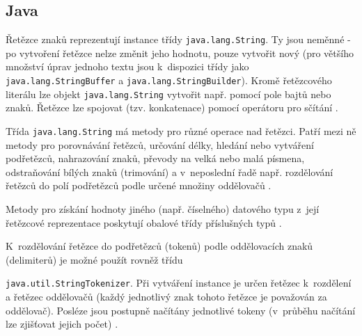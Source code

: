 \documentclass{bakalarka}
\begin{document}
\subsection{Java}
Řetězce znaků reprezentují instance třídy \texttt{java.lang.String}. Ty jsou neměnné - po vytvoření řetězce nelze změnit jeho hodnotu, pouze vytvořit nový (pro většího množství úprav jednoho textu jsou k~dispozici třídy jako \texttt{java.lang.StringBuffer} a \texttt{java.lang.StringBuilder}). Kromě řetězcového literálu lze objekt \texttt{java.lang.String} vytvořit např. pomocí pole bajtů nebo znaků. Řetězce lze spojovat (tzv. konkatenace) pomocí operátoru pro sčítání \cite{java-guide-strings, java-guide-string, java-guide-stringbuffer, java-guide-stringbuilder}.\par
Třída \texttt{java.lang.String} má metody pro různé operace nad řetězci. Patří mezi ně metody pro porovnávání řetězců, určování délky, hledání nebo vytváření podřetězců, nahrazování znaků, převody na velká nebo malá písmena, odstraňování bílých znaků (trimování) a v~neposlední řadě např. rozdělování řetězců do polí podřetězců podle určené množiny oddělovačů \cite{java-guide-string}.\par
Metody pro získání hodnoty jiného (např. číselného) datového typu z~její řetězcové reprezentace poskytují obalové třídy příslušných typů \cite{java-guide-string, java-guide-byte, java-guide-short, java-guide-integer, java-guide-long, java-guide-float, java-guide-double, java-guide-boolean, java-guide-character}.\par
K~rozdělování řetězce do podřetězců (tokenů) podle oddělovacích znaků (delimiterů) je možné použít rovněž třídu \par\noindent\texttt{java.util.StringTokenizer}. Při vytváření instance je určen řetězec k~rozdělení a řetězec oddělovačů (každý jednotlivý znak tohoto řetězce je považován za oddělovač). Posléze jsou postupně načítány jednotlivé tokeny (v~průběhu načítání lze zjišťovat jejich počet) \cite{java-guide-stringtokenizer}.
\end{document}
